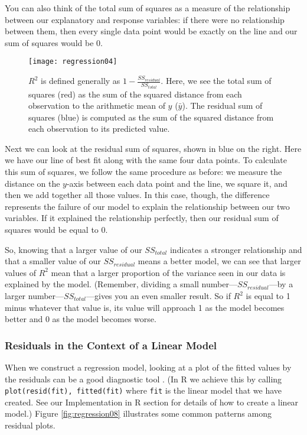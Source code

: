 You can also think of the total sum of squares as a measure of the relationship between our explanatory and response variables: if there were no relationship between them, then every single data point would be exactly on the line and our sum of squares would be $0$.

\begin{figure}[htp]
\texttt{[image: regression04]}
\caption{$R^2$ is defined generally as $1-\frac{SS_{residual}}{SS_{total}}$. Here, we see the total sum of squares (red) as the sum of the squared distance from each observation to the arithmetic mean of $y$ ($\bar{y}$). The residual sum of squares (blue) is computed as the sum of the squared distance from each observation to its predicted value.}
\label{fig:regression04}
\end{figure}

Next we can look at the residual sum of squares, shown in blue on the right. Here we have our line of best fit along with the same four data points. To calculate this sum of squares, we follow the same procedure as before: we measure the distance on the $y$-axis between each data point and the line, we square it, and then we add together all those values. In this case, though, the difference represents the failure of our model to explain the relationship between our two variables. If it explained the relationship perfectly, then our residual sum of squares would be equal to 0.

So, knowing that a larger value of our $SS_{total}$ indicates a stronger relationship and that a smaller value of our $SS_{residual}$ means a better model, we can see that larger values of $R^2$ mean that a larger proportion of the variance seen in our data is explained by the model. (Remember, dividing a small number---$SS_{residual}$---by a larger number---$SS_{total}$---gives you an even smaller result. So if $R^2$ is equal to 1 minus whatever that value is, its value will approach 1 as the model becomes better and 0 as the model becomes worse.

\subsubsection{Residuals in the Context of a Linear Model}

When we construct a regression model, looking at a plot of the fitted values by the residuals can be a good diagnostic tool . (In R we achieve this by calling \verb|plot(resid(fit), fitted(fit)| where \verb|fit| is the linear model that we have created. See our Implementation in R section for details of how to create a linear model.) Figure \ref{fig:regression08} illustrates some common patterns among residual plots.

